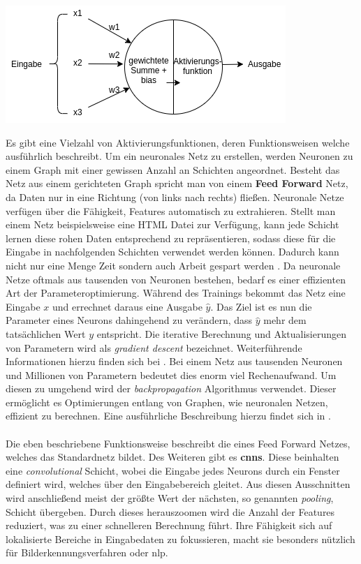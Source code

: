 \documentclass[
    12pt, %
    DIV10,
    ngerman, %
    a4paper, %
    oneside, %
    titlepage, %
    parskip=half, %
    headings=normal, %
    listof=totoc, %
    bibliography=totoc, %
    index=totoc, %
    captions=tableheading, %
    final %
]{scrreprt}
\begin{document}
\begin{center}
\includegraphics[scale=0.6]{img/neuron.png}
\label{fig:neuron}
\end{center}
Es gibt eine Vielzahl von Aktivierungsfunktionen, deren Funktionsweisen welche \textcite{JoshuaSaxe2018} ausführlich beschreibt. Um ein neuronales Netz zu erstellen, werden Neuronen zu einem Graph mit einer gewissen Anzahl an Schichten angeordnet. Besteht das Netz aus einem gerichteten Graph spricht man von einem \textbf{Feed Forward} Netz, da Daten nur in eine Richtung (von links nach rechts) flie{\ss}en. Neuronale Netze verfügen über die Fähigkeit, Features automatisch zu extrahieren. Stellt man einem Netz beispielsweise eine HTML Datei zur Verfügung, kann jede Schicht lernen diese rohen Daten entsprechend zu repräsentieren, sodass diese für die Eingabe in nachfolgenden Schichten verwendet werden können. Dadurch kann nicht nur eine Menge Zeit sondern auch Arbeit gespart werden \parencite{JoshuaSaxe2018}. Da neuronale Netze oftmals aus tausenden von Neuronen bestehen, bedarf es einer effizienten Art der Parameteroptimierung. Während des Trainings bekommt das Netz eine Eingabe $x$ und errechnet daraus eine Ausgabe $\hat{y}$. Das Ziel ist es nun die Parameter eines Neurons dahingehend zu verändern, dass $\hat{y}$ mehr dem tatsächlichen Wert $y$ entspricht. Die iterative Berechnung und Aktualisierungen von Parametern wird als \emph{gradient descent} bezeichnet. Weiterführende Informationen hierzu finden sich bei \textcite{bonaccorso2018python}. Bei einem Netz aus tausenden Neuronen und Millionen von Parametern bedeutet dies enorm viel Rechenaufwand. Um diesen zu umgehend wird der \emph{backpropagation} Algorithmus verwendet. Dieser ermöglicht es Optimierungen entlang von Graphen, wie neuronalen Netzen, effizient zu berechnen. Eine ausführliche Beschreibung hierzu findet sich in \textcite{krohn2019deep}.\\\\
Die eben beschriebene Funktionsweise beschreibt die eines Feed Forward Netzes, welches das Standardnetz bildet. Des Weiteren gibt es \textbf{\ac{cnns}}. Diese beinhalten eine \emph{convolutional} Schicht, wobei die Eingabe jedes Neurons durch ein Fenster definiert wird, welches über den Eingabebereich gleitet. Aus diesen Ausschnitten wird anschlie{\ss}end meist der grö{\ss}te Wert der nächsten, so genannten \emph{pooling}, Schicht übergeben. Durch dieses herauszoomen wird die Anzahl der Features reduziert, was zu einer schnelleren Berechnung führt. Ihre Fähigkeit sich auf lokalisierte Bereiche in Eingabedaten zu fokussieren, macht sie besonders nützlich für Bilderkennungsverfahren oder \ac{nlp}.\\\\
\end{document}
